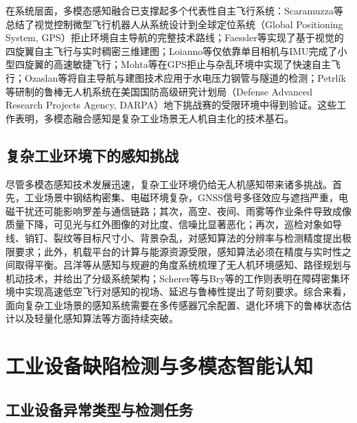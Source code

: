 在系统层面，多模态感知融合已支撑起多个代表性自主飞行系统：Scaramuzza等\cite{scaramuzza2014vision}总结了视觉控制微型飞行机器人从系统设计到全球定位系统（Global Positioning System, GPS）拒止环境自主导航的完整技术路线；Faessler等\cite{faessler2016autonomous}实现了基于视觉的四旋翼自主飞行与实时稠密三维建图；Loianno等\cite{loianno2017estimation}仅依靠单目相机与IMU完成了小型四旋翼的高速敏捷飞行；Mohta等\cite{mohta2018fast}在GPS拒止与杂乱环境中实现了快速自主飞行；Ozaslan等\cite{ozaslan2017autonomous}将自主导航与建图技术应用于水电压力钢管与隧道的检测；Petrlík等\cite{petrlik2020robust}研制的鲁棒无人机系统在美国国防高级研究计划局（Defense Advanced Research Projects Agency, DARPA）地下挑战赛的受限环境中得到验证。这些工作表明，多模态融合感知是复杂工业场景无人机自主化的技术基石。

\subsection{复杂工业环境下的感知挑战}

尽管多模态感知技术发展迅速，复杂工业环境仍给无人机感知带来诸多挑战。首先，工业场景中钢结构密集、电磁环境复杂，GNSS信号多径效应与遮挡严重，电磁干扰还可能影响罗差与通信链路\cite{lvyang2019sense,zeng2016wireless}；其次，高空、夜间、雨雾等作业条件导致成像质量下降，可见光与红外图像的对比度、信噪比显著恶化\cite{jadin2012recent,morgenthal2014quality}；再次，巡检对象如导线、销钉、裂纹等目标尺寸小、背景杂乱，对感知算法的分辨率与检测精度提出极限要求\cite{nguyen2018automatic,zhouwq2024review}；此外，机载平台的计算与能源资源受限，感知算法必须在精度与实时性之间取得平衡\cite{kanellakis2017survey,zhou2018computation}。吕洋等\cite{lvyang2019sense}从感知与规避的角度系统梳理了无人机环境感知、路径规划与机动技术，并给出了分级系统架构；Scherer等\cite{scherer2008flying}与Bry等\cite{bry2015aggressive}的工作则表明在障碍密集环境中实现高速低空飞行对感知的视场、延迟与鲁棒性提出了苛刻要求。综合来看，面向复杂工业场景的感知系统需要在多传感器冗余配置、退化环境下的鲁棒状态估计以及轻量化感知算法等方面持续突破。

\section{工业设备缺陷检测与多模态智能认知}

\subsection{工业设备异常类型与检测任务}

